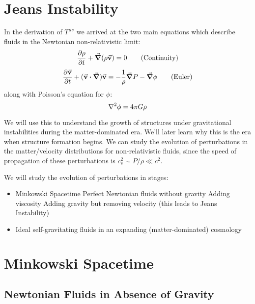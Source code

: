 \documentclass[a4paper,twoside,master.tex]{subfiles}
\begin{document}

\section{Jeans Instability}\label{sec:jeans_instability}

In the derivation of $ T^{\mu \nu} $ we arrived at the two main equations which describe fluids in the Newtonian non-relativistic limit:
\begin{equation}
    \pdv{\rho}{t} + \grad{(\rho \va{v})} = 0 \tag{Continuity}
\end{equation}
\begin{equation}
    \pdv{\va{v}}{t} + (\va{v} \vdot \grad)\va{v} = - \frac{1}{\rho} \grad{P} - \grad{\phi} \tag{Euler}
\end{equation}
along with Poisson's equation for $ \phi $:
\begin{equation}
    \laplacian{\phi} = 4 \pi G \rho
\end{equation}

We will use this to understand the growth of structures under gravitational instabilities during the matter-dominated era. We'll later learn why this is the era when structure formation begins. We can study the evolution of perturbations in the matter/velocity distributions for non-relativistic fluids, since the speed of propagation of these perturbations is $ c_s^2 \sim P/\rho \ll c^2 $.

We will study the evolution of perturbations in stages:
\begin{itemize}
    \item Minkowski Spacetime
        \subitem Perfect Newtonian fluids without gravity
        \subitem Adding viscosity
        \subitem Adding gravity but removing velocity (this leads to Jeans Instability)
    \item Ideal self-gravitating fluids in an expanding (matter-dominated) cosmology
\end{itemize}

\section{Minkowski Spacetime}\label{sec:minkowski_spacetime}

\subsection{Newtonian Fluids in Absence of Gravity}\label{sub:newtonian_fluids_in_absence_of_gravity}
\end{document}
